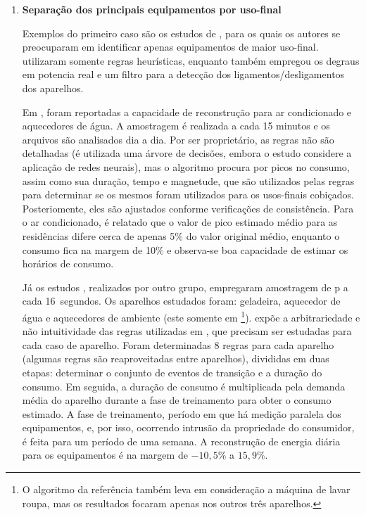 \begin{enumerate}[label=\textbf{1.\arabic*},wide=\parindent]
\begin{enumerate}[label*=.\textbf{\arabic*},wide=\parindent]
\item \textbf{Separação dos principais equipamentos por uso-final}

Exemplos do primeiro caso são os estudos de
\citet*{nilm_powers_15minsamp_1991_16,nilm_farinaccio_16ssamp_1999_17,
nilm_marceau_16ssamp_improved_1999_18},
para os quais os autores se preocuparam em identificar apenas
equipamentos de maior uso-final.
\cite{nilm_powers_15minsamp_1991_16,nilm_farinaccio_16ssamp_1999_17}
utilizaram somente regras heurísticas, enquanto
\cite{nilm_marceau_16ssamp_improved_1999_18} também empregou os
degraus em potencia real e um filtro para a detecção dos
ligamentos/desligamentos dos aparelhos.

Em \cite{nilm_powers_15minsamp_1991_16}, foram reportadas a capacidade
de reconstrução para ar condicionado e aquecedores de água. A
amostragem é realizada a cada 15 minutos e os arquivos são analisados
dia a dia. Por ser proprietário, as regras não são detalhadas (é
utilizada uma árvore de decisões, embora o estudo considere a aplicação
de redes neurais), mas o algoritmo procura por picos no consumo, assim
como sua duração, tempo e magnetude, que são utilizados pelas regras
para determinar se os mesmos foram utilizados para os usos-finais
cobiçados. Posteriomente, eles são ajustados conforme
verificações de consistência. Para o ar condicionado, é relatado que o
valor de pico estimado médio para as residências difere cerca de
apenas 5\% do valor original médio, enquanto o consumo fica na margem
de 10\% e observa-se boa capacidade de estimar os horários de consumo.
 
Já os estudos \cite{nilm_farinaccio_16ssamp_1999_17,
nilm_marceau_16ssamp_improved_1999_18}, realizados por outro
grupo, empregaram amostragem de \acs{p} a cada 16~segundos. Os
aparelhos estudados foram: geladeira, aquecedor de água e aquecedores
de ambiente (este somente em
\cite{nilm_marceau_16ssamp_improved_1999_18}\footnote{O algoritmo da
referência \cite{nilm_marceau_16ssamp_improved_1999_18}
também leva em consideração a máquina de lavar roupa, mas os
resultados focaram apenas nos outros três aparelhos.}).
\cite{nilm_zeifman_review_2011} expõe a arbitrariedade e não
intuitividade das regras utilizadas em
\cite{nilm_farinaccio_16ssamp_1999_17}, que precisam ser estudadas
para cada caso de aparelho. Foram determinadas 8 regras para cada
aparelho (algumas regras são reaproveitadas entre aparelhos),
divididas em duas etapas: determinar o conjunto de eventos de
transição e a duração do consumo.  Em seguida, a duração de consumo é
multiplicada pela demanda média do aparelho durante a fase de
treinamento para obter o consumo estimado. A fase de treinamento,
período em que há medição paralela dos equipamentos, e, por isso,
ocorrendo intrusão da propriedade do consumidor, é feita para um
período de uma semana. A reconstrução de energia diária para os
equipamentos é na margem de $-10,5\%$ a $15,9\%$.


\end{enumerate}
\end{enumerate}
